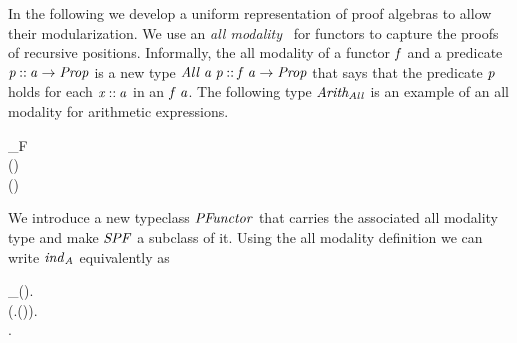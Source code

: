 In the following we develop a uniform representation of proof algebras
to allow their modularization. We use an \emph{all
modality}~\cite{benke:universes} for functors to capture the proofs of
recursive positions. Informally, the all modality of a functor \ensuremath{\Varid{f}} and
a predicate \ensuremath{\Varid{p}\mathbin{::}\Varid{a}\to \Conid{Prop}} is a new type \ensuremath{\Conid{All}\;\Varid{a}\;\Varid{p}\mathbin{::}\Varid{f}\;\Varid{a}\to \Conid{Prop}}
that says that the predicate \ensuremath{\Varid{p}} holds for each \ensuremath{\Varid{x}\mathbin{::}\Varid{a}} in an \ensuremath{\Varid{f}\;\Varid{a}}. The following type \ensuremath{\Varid{Arith_{All}}} is an example of an all modality for
arithmetic expressions.
\begin{hscode}\SaveRestoreHook
{}%
%
%
%
%
%
\>[3]{}\;\;\;\mathbin{::}_F\;\to {}\;\<[E]%
\\
\>[3]{}\<[5]%
\>[5]{}\<[11]%
\>[11]{}\mathbin{::}{}\<[29]%
\>[29]{}\;\;\;(\;){}\<[E]%
\\
\>[3]{}\<[5]%
\>[5]{}\<[11]%
\>[11]{}\mathbin{::}\;\to {}\;\to {}\<[29]%
\>[29]{}\;\;\;(\;\;){}\<[E]%
\ColumnHook
\end{hscode}\resethooks
We introduce a new typeclass \ensuremath{\Conid{PFunctor}} that carries the associated
all modality type and make \ensuremath{\Conid{SPF}} a subclass of it. Using the all
modality definition we can write \ensuremath{\Varid{ind}_{\Conid{A}}} equivalently as


\begin{hscode}\SaveRestoreHook
{}%
%
%
%
%
\>[3]{}_{}\prime\mathbin{::}{}\<[17]%
\>[17]{}\forall {}\hsforall {}\<[27]%
\>[27]{}\mathbin{::}(\to {}).{}\<[E]%
\\
\>[17]{}\forall {}\hsforall {}\<[27]%
\>[27]{}\mathbin{::}(\forall {}\hsforall .\;\;\to {}\;(\;)).{}\<[E]%
\\
\>[17]{}\forall {}\hsforall .\;\<[E]%
\ColumnHook
\end{hscode}\resethooks

